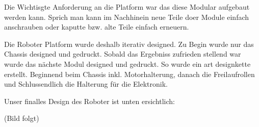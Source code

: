 Die Wichtisgte Anforderung an die Platform war das diese Modular aufgebaut werden kann. Sprich man kann im Nachhinein
neue Teile doer Module einfach anschrauben oder kaputte bzw. alte Teile einfach erneuern.

Die Roboter Platform wurde deshalb iterativ designed. Zu Begin wurde nur das Chassis designed und gedruckt.
Sobald das Ergebniss zufrieden stellend war wurde das nächste Modul designed und gedruckt.
So wurde ein art designkette erstellt. Beginnend beim Chassis inkl. Motorhalterung, danach die Freilaufrollen und
Schlussendlich die Halterung für die Elektronik.

Unser finalles Design des Roboter ist unten ersichtlich:

(Bild folgt)
